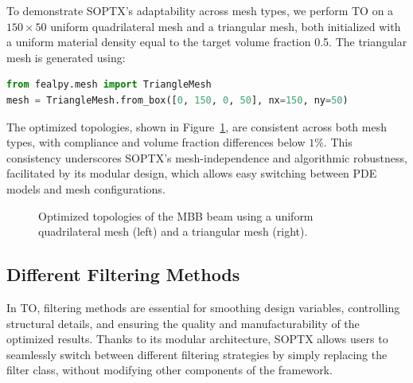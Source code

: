 \documentclass[mathpazo]{cicp}
\begin{document}
To demonstrate SOPTX's adaptability across mesh types, we perform TO on a $150 \times 50$ uniform quadrilateral mesh and a triangular mesh, both initialized with a uniform material density equal to the target volume fraction 0.5. The triangular mesh is generated using:
\vspace{-0.5ex} %
\begin{lstlisting}[language=Python]
from fealpy.mesh import TriangleMesh
mesh = TriangleMesh.from_box([0, 150, 0, 50], nx=150, ny=50)
\end{lstlisting}
\vspace{-0.5ex} %

The optimized topologies, shown in Figure~\ref{fig:mbb_2d_all}, are consistent across both mesh types, with compliance and volume fraction differences below $1\%$. This consistency underscores SOPTX's mesh-independence and algorithmic robustness, facilitated by its modular design, which allows easy switching between PDE models and mesh configurations.

\vspace{-2ex} %
\begin{figure}[htp]
	\centering
	\caption{Optimized topologies of the MBB beam using a uniform quadrilateral mesh (left) and a triangular mesh (right).}
	\label{fig:mbb_2d_all}
\end{figure}
\vspace{-2ex} %

\subsection{Different Filtering Methods}
In TO, filtering methods are essential for smoothing design variables, controlling structural details, and ensuring the quality and manufacturability of the optimized results. Thanks to its modular architecture, SOPTX allows users to seamlessly switch between different filtering strategies by simply replacing the filter class, without modifying other components of the framework.
\end{document}
